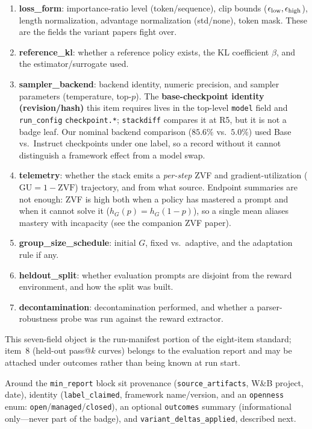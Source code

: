 \begin{enumerate}[leftmargin=1.8em, itemsep=0.1em]
  \item \textbf{loss_form}: importance-ratio level (token/sequence), clip
        bounds ($\epsilon_{\text{low}}, \epsilon_{\text{high}}$), length
        normalization, advantage normalization (std/none), token mask. These
        are the fields the variant papers fight over.
  \item \textbf{reference_kl}: whether a reference policy exists, the KL
        coefficient $\beta$, and the estimator/surrogate used.
  \item \textbf{sampler_backend}: backend identity, numeric precision, and sampler
        parameters (temperature, top-$p$). The \textbf{base-checkpoint
        identity (revision/hash)} this item requires lives in the top-level
        \texttt{model} field and \texttt{run\_config} \texttt{checkpoint.*};
        \texttt{stackdiff} compares it at R5, but it is not a badge leaf. Our
        nominal backend comparison ($85.6\%$ vs.\ $5.0\%$) used Base vs.\
        Instruct checkpoints under one label, so a record without it
        cannot distinguish a framework effect from a model swap.
  \item \textbf{telemetry}: whether the stack emits a \emph{per-step} ZVF and
        gradient-utilization ($\mathrm{GU}=1-\mathrm{ZVF}$) trajectory, and
        from what source. Endpoint summaries are not enough: ZVF is high both
        when a policy has mastered a prompt and when it cannot solve it
        ($h_G(p)=h_G(1-p)$), so a single mean aliases mastery with incapacity
        (see the companion ZVF paper).
  \item \textbf{group_size_schedule}: initial $G$, fixed vs.\ adaptive, and
        the adaptation rule if any.
  \item \textbf{heldout_split}: whether evaluation prompts are disjoint from
        the reward environment, and how the split was built.
  \item \textbf{decontamination}: decontamination performed, and whether a
        parser-robustness probe was run against the reward extractor.
\end{enumerate}

This seven-field object is the run-manifest portion of the eight-item standard;
item~8 (held-out pass@$k$ curves) belongs to the evaluation report and may be
attached under outcomes rather than being known at run start.

Around the \texttt{min_report} block sit provenance
(\texttt{source_artifacts}, W\&B project, date), identity
(\texttt{label_claimed}, framework name/version, and an
\texttt{openness} enum: \texttt{open}/\texttt{managed}/\texttt{closed}), an
optional \texttt{outcomes} summary (informational only---never part of the
badge), and \texttt{variant_deltas_applied}, described next.

